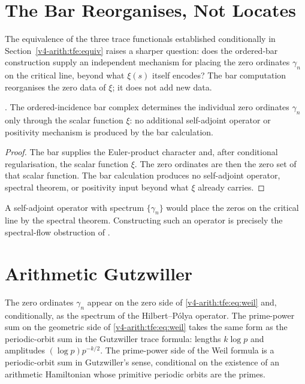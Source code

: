 \section{The Bar Reorganises, Not Locates}
\label{v4-arith:tfe:no-free}

The equivalence of the three trace functionals established conditionally
in Section~\ref{v4-arith:tfe:equiv} raises a sharper question: does the
ordered-bar construction supply an independent mechanism for placing the
zero ordinates $\gamma_n$ on the critical line, beyond what $\xi(s)$
itself encodes? The bar computation reorganises the zero data of $\xi$;
it does not add new data.

\begin{theorem}
\label{v4-arith:tfe:thm:no-free-zeros}
\ClaimStatusProvedHere. The ordered-incidence bar complex determines
the individual zero ordinates \(\gamma_n\) only through the scalar
function \(\xi\): no additional self-adjoint operator or positivity
mechanism is produced by the bar calculation.
\end{theorem}

\begin{proof}
The bar supplies the Euler-product character and, after conditional
regularisation, the scalar function \(\xi\). The zero ordinates are
then the zero set of that scalar function. The bar calculation
produces no self-adjoint operator, spectral theorem, or positivity
input beyond what \(\xi\) already carries.
\end{proof}

\begin{remark}
\label{v4-arith:tfe:rem:hilbert-polya}
A self-adjoint operator with spectrum $\{\gamma_n\}$ would place the
zeros on the critical line by the spectral theorem. Constructing such
an operator is precisely the spectral-flow obstruction of
.
\end{remark}

\section{Arithmetic Gutzwiller}
\label{v4-arith:tfe:gutzwiller}

The zero ordinates $\gamma_n$ appear on the zero side of
\eqref{v4-arith:tfe:eq:weil} and, conditionally, as the spectrum of
the Hilbert--P\'{o}lya operator. The prime-power sum on the geometric
side of \eqref{v4-arith:tfe:eq:weil} takes the same form as the
periodic-orbit sum in the Gutzwiller trace formula: lengths $k\log p$
and amplitudes $(\log p) p^{-k/2}$. The prime-power side of the Weil formula is a periodic-orbit sum in
Gutzwiller's sense, conditional on the existence of an arithmetic
Hamiltonian whose primitive periodic orbits are the primes.


